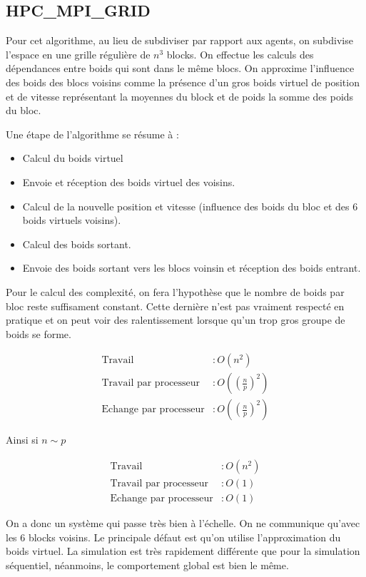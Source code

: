 \documentclass[liens,entete-ensimag,margeCorrection]{ensirapport}
\begin{document}
\subsection{HPC\_MPI\_GRID}

Pour cet algorithme, au lieu de subdiviser par rapport aux agents, on subdivise l'espace en une grille régulière de $n^3$ blocks.
On effectue les calculs des dépendances entre boids qui sont dans le même blocs.
On approxime l'influence des boids des blocs voisins comme la présence d'un gros boids virtuel de position et de vitesse représentant la moyennes du block
et de poids la somme des poids du bloc.

Une étape de l'algorithme se résume à :
\begin{itemize}
    \item Calcul du boids virtuel
    \item Envoie et réception des boids virtuel des voisins.
    \item Calcul de la nouvelle position et vitesse (influence des boids du bloc et des 6 boids virtuels voisins).
    \item Calcul des boids sortant.
    \item Envoie des boids sortant vers les blocs voinsin et réception des boids entrant.
\end{itemize}

Pour le calcul des complexité, on fera l'hypothèse que le nombre de boids par bloc reste suffisament constant.
Cette dernière n'est pas vraiment respecté en pratique et on peut voir des ralentissement lorsque qu'un trop gros groupe de boids se forme.

\begin{align*}
    \text{Travail} &: O\left( n^2 \right) \\
    \text{Travail par processeur} &: O\left( \left(\frac np \right)^2 \right)  \\
    \text{Echange par processeur} &: O\left( \left(\frac np \right)^2 \right)
\end{align*}

Ainsi si $n \sim p$

\begin{align*}
    \text{Travail} &: O\left( n^2 \right) \\
    \text{Travail par processeur} &: O\left( 1 \right)  \\
    \text{Echange par processeur} &: O\left( 1 \right)
\end{align*}

On a donc un système qui passe très bien à l'échelle. On ne communique qu'avec les 6 blocks voisins.
Le principale défaut est qu'on utilise l'approximation du boids virtuel.
La simulation est très rapidement différente que pour la simulation séquentiel, néanmoins, le comportement global est bien le même.
\end{document}
